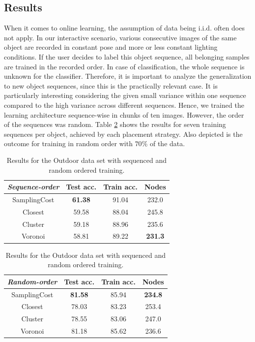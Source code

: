 \documentclass[conference]{IEEEtran}
\begin{document}
\subsection{Results}
When it comes to online learning, the assumption of data being i.i.d. \cite{Carlevarino00anincremental} often does not apply.
In our interactive scenario, various consecutive images of the same object are recorded in constant pose and more or less constant lighting conditions. 
If the user decides to label this object sequence, all belonging samples are trained in the recorded order. In case of classification, the whole sequence is unknown
for the classifier. Therefore, it is important to analyze the generalization to new object
sequences, since this is the practically relevant case. 
It is particularly interesting considering the given small variance within one sequence compared to the high variance across different sequences. 
Hence, we trained the learning architecture sequence-wise in chunks of ten images. However, the order of the sequences was random.
Table \ref{tab:OutdoorChunkWise} shows the results for seven training sequences per object, achieved by each placement strategy. 
Also depicted is the outcome for training in random order with $70\%$ of the data. 
\begin{table}
\centering
\caption{Results for the Outdoor data set with sequenced and random ordered training.}
\label{tab:OutdoorChunkWise}
\begin{tabular}{c|ccc}
\textit{Sequence-order} & Test acc. & Train acc. & Nodes\\\hline
\rule{0pt}{10pt}
SamplingCost & \textbf{61.38} & 91.04& 232.0\\
Closest & 59.58 & 88.04 & 245.8\\
Cluster & 59.18 & 88.96 & 235.6\\
Voronoi & 58.81 & 89.22 & \textbf{231.3}
\end{tabular}
\par\vspace{5 pt}
\begin{tabular}{c|ccc}
\textit{Random-order} & Test acc. & Train acc. & Nodes\\\hline
\rule{0pt}{10pt}
SamplingCost & \textbf{81.58} & 85.94 &\textbf{234.8}\\
Closest & 78.03 & 83.23 & 253.4\\
Cluster & 78.55 & 83.06 & 247.0\\
Voronoi & 81.18 & 85.62 & 236.6
\end{tabular}
\end{table}
\end{document}

